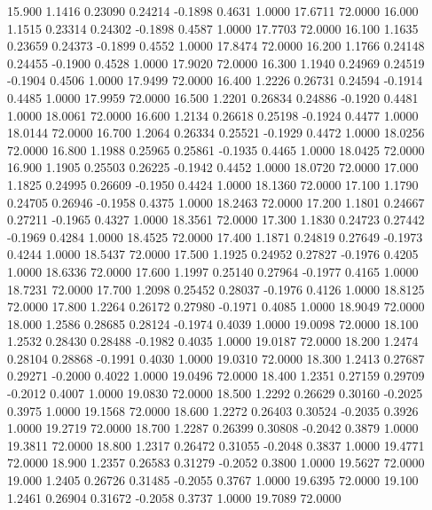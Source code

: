   15.900   1.1416   0.23090   0.24214  -0.1898   0.4631   1.0000  17.6711  72.0000
  16.000   1.1515   0.23314   0.24302  -0.1898   0.4587   1.0000  17.7703  72.0000
  16.100   1.1635   0.23659   0.24373  -0.1899   0.4552   1.0000  17.8474  72.0000
  16.200   1.1766   0.24148   0.24455  -0.1900   0.4528   1.0000  17.9020  72.0000
  16.300   1.1940   0.24969   0.24519  -0.1904   0.4506   1.0000  17.9499  72.0000
  16.400   1.2226   0.26731   0.24594  -0.1914   0.4485   1.0000  17.9959  72.0000
  16.500   1.2201   0.26834   0.24886  -0.1920   0.4481   1.0000  18.0061  72.0000
  16.600   1.2134   0.26618   0.25198  -0.1924   0.4477   1.0000  18.0144  72.0000
  16.700   1.2064   0.26334   0.25521  -0.1929   0.4472   1.0000  18.0256  72.0000
  16.800   1.1988   0.25965   0.25861  -0.1935   0.4465   1.0000  18.0425  72.0000
  16.900   1.1905   0.25503   0.26225  -0.1942   0.4452   1.0000  18.0720  72.0000
  17.000   1.1825   0.24995   0.26609  -0.1950   0.4424   1.0000  18.1360  72.0000
  17.100   1.1790   0.24705   0.26946  -0.1958   0.4375   1.0000  18.2463  72.0000
  17.200   1.1801   0.24667   0.27211  -0.1965   0.4327   1.0000  18.3561  72.0000
  17.300   1.1830   0.24723   0.27442  -0.1969   0.4284   1.0000  18.4525  72.0000
  17.400   1.1871   0.24819   0.27649  -0.1973   0.4244   1.0000  18.5437  72.0000
  17.500   1.1925   0.24952   0.27827  -0.1976   0.4205   1.0000  18.6336  72.0000
  17.600   1.1997   0.25140   0.27964  -0.1977   0.4165   1.0000  18.7231  72.0000
  17.700   1.2098   0.25452   0.28037  -0.1976   0.4126   1.0000  18.8125  72.0000
  17.800   1.2264   0.26172   0.27980  -0.1971   0.4085   1.0000  18.9049  72.0000
  18.000   1.2586   0.28685   0.28124  -0.1974   0.4039   1.0000  19.0098  72.0000
  18.100   1.2532   0.28430   0.28488  -0.1982   0.4035   1.0000  19.0187  72.0000
  18.200   1.2474   0.28104   0.28868  -0.1991   0.4030   1.0000  19.0310  72.0000
  18.300   1.2413   0.27687   0.29271  -0.2000   0.4022   1.0000  19.0496  72.0000
  18.400   1.2351   0.27159   0.29709  -0.2012   0.4007   1.0000  19.0830  72.0000
  18.500   1.2292   0.26629   0.30160  -0.2025   0.3975   1.0000  19.1568  72.0000
  18.600   1.2272   0.26403   0.30524  -0.2035   0.3926   1.0000  19.2719  72.0000
  18.700   1.2287   0.26399   0.30808  -0.2042   0.3879   1.0000  19.3811  72.0000
  18.800   1.2317   0.26472   0.31055  -0.2048   0.3837   1.0000  19.4771  72.0000
  18.900   1.2357   0.26583   0.31279  -0.2052   0.3800   1.0000  19.5627  72.0000
  19.000   1.2405   0.26726   0.31485  -0.2055   0.3767   1.0000  19.6395  72.0000
  19.100   1.2461   0.26904   0.31672  -0.2058   0.3737   1.0000  19.7089  72.0000
